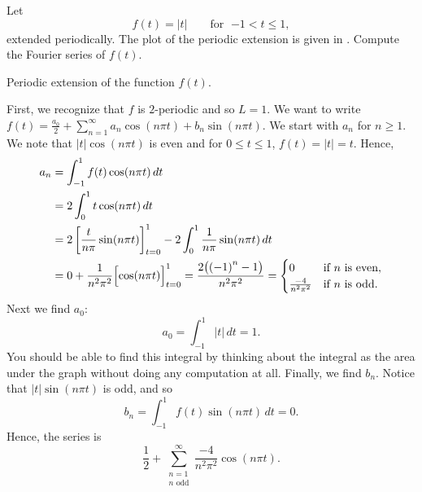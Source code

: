 \begin{example}
Let
\begin{equation*}
f(t) =
\lvert t \rvert
\qquad \text{for } \; {-1} < t \leq 1,
\end{equation*}
extended periodically.  The plot of the
periodic extension is given in .
Compute the Fourier series of $f(t)$.

\begin{myfig}
\capstart
{}
\caption{Periodic extension of the function $f(t)$.\label{gfs:sawcontfig}}
\end{myfig}

First, we recognize that $f$ is $2$-periodic and so $L=1$.
We want to
write $f(t) = \frac{a_0}{2} + \sum_{n=1}^\infty a_n \cos (n \pi t) + b_n
\sin (n \pi t)$.  We start with $a_n$ for $n \geq 1$.
We note that $\lvert t \rvert \cos (n \pi t)$
is even and for $0 \leq t \leq 1$, $f(t) = \lvert t \rvert = t$.  Hence,
\begin{equation*}
\begin{split}
a_n & = \int_{-1}^1 f(t) \cos (n \pi t) \, dt \\
& = 2 \int_{0}^1 t \cos (n \pi t) \, dt \\
 & = 2 \left[ \frac{t}{n \pi} \sin (n \pi t) \right]_{t=0}^1 -
2 \int_{0}^1 \frac{1}{n \pi} \sin (n \pi t) \, dt \\
& =  0 + \frac{1}{n^2 \pi^2} \Bigl[ \cos (n \pi t) \Bigr]_{t=0}^1
 =  \frac{2 \bigl( {(-1)}^n -1 \bigr) }{n^2 \pi^2}
=
\begin{cases}
0 & \text{if } n \text{ is even} , \\
\frac{-4 }{n^2 \pi^2} & \text{if } n \text{ is odd}  .
\end{cases}
\end{split}
\end{equation*}
Next we find $a_0$:
\begin{equation*}
a_0 = \int_{-1}^1 \lvert t \rvert \, dt 
=
1 .
\end{equation*}
You should be able to find this integral by thinking about the integral
as the area under the graph without doing any computation at all.
Finally, we find $b_n$.  Notice that
$\lvert t \rvert \sin (n \pi t)$ is odd, and so
\begin{equation*}
b_n = \int_{-1}^1 f(t) \sin (n \pi t) \, dt = 0 .
\end{equation*}
Hence,
the series is 
\begin{equation*}
\frac{1}{2} + 
\sum_{\substack{n=1 \\ n \text{ odd}}}^\infty \frac{-4}{n^2 \pi^2} \cos (n \pi t) .
\end{equation*}


\end{example}

